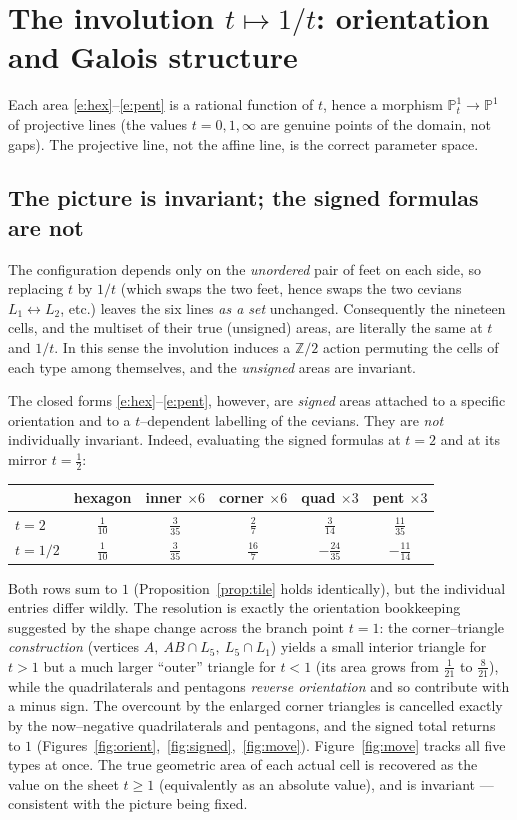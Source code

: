 \documentclass[11pt,a4paper,reqno]{amsart}
\theoremstyle{definition}
\theoremstyle{remark}
\newcommand{\PP}{\mathbb{P}}
\newcommand{\ZZ}{\mathbb{Z}}
\begin{document}
\section{The involution $t\mapsto1/t$: orientation and Galois structure}\label{sec:galois}
Each area \eqref{e:hex}--\eqref{e:pent} is a rational function of $t$, hence a morphism $\PP^1_t\to\PP^1$ of
projective lines (the values $t=0,1,\infty$ are genuine points of the domain, not gaps). The projective line, not
the affine line, is the correct parameter space.

\subsection{The picture is invariant; the signed formulas are not}
The configuration depends only on the \emph{unordered} pair of feet on each side, so replacing $t$ by $1/t$
(which swaps the two feet, hence swaps the two cevians $L_1\leftrightarrow L_2$, etc.) leaves the six lines
\emph{as a set} unchanged. Consequently the nineteen cells, and the multiset of their true (unsigned) areas, are
literally the same at $t$ and $1/t$. In this sense the involution induces a $\ZZ/2$ action permuting the cells of
each type among themselves, and the \emph{unsigned} areas are invariant.

The closed forms \eqref{e:hex}--\eqref{e:pent}, however, are \emph{signed} areas attached to a specific
orientation and to a $t$--dependent labelling of the cevians. They are \emph{not} individually invariant. Indeed,
evaluating the signed formulas at $t=2$ and at its mirror $t=\tfrac12$:
\begin{center}
\begin{tabular}{lccccc}
\toprule
& hexagon & inner $\times6$ & corner $\times6$ & quad $\times3$ & pent $\times3$ \\
\midrule
$t=2$   & $\tfrac1{10}$ & $\tfrac{3}{35}$ & $\tfrac{2}{7}$ & $\tfrac{3}{14}$ & $\tfrac{11}{35}$ \\[2pt]
$t=1/2$ & $\tfrac1{10}$ & $\tfrac{3}{35}$ & $\tfrac{16}{7}$ & $-\tfrac{24}{35}$ & $-\tfrac{11}{14}$ \\
\bottomrule
\end{tabular}
\end{center}
Both rows sum to $1$ (Proposition~\ref{prop:tile} holds identically), but the individual entries differ wildly.
The resolution is exactly the orientation bookkeeping suggested by the shape change across the branch point
$t=1$: the corner--triangle \emph{construction} (vertices $A,\ AB\cap L_5,\ L_5\cap L_1$) yields a small interior
triangle for $t>1$ but a much larger ``outer'' triangle for $t<1$ (its area grows from $\tfrac1{21}$ to
$\tfrac{8}{21}$), while the quadrilaterals and pentagons \emph{reverse orientation} and so contribute with a minus
sign. The overcount by the enlarged corner triangles is cancelled exactly by the now--negative
quadrilaterals and pentagons, and the signed total returns to $1$ (Figures~\ref{fig:orient},~\ref{fig:signed},~\ref{fig:move}). Figure~\ref{fig:move}
tracks all five types at once.
The true geometric area of each actual cell is recovered as the value on the sheet $t\ge1$ (equivalently as an
absolute value), and is invariant --- consistent with the picture being fixed.
\end{document}
